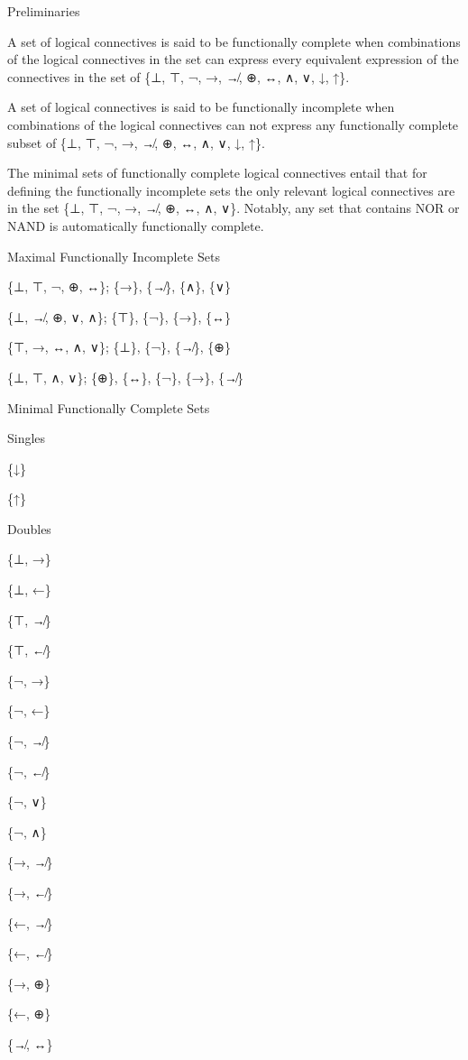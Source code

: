 \protect\hypertarget{anchor}{}{}Preliminaries

A set of logical connectives is said to be functionally complete when
combinations of the logical connectives in the set can express every
equivalent expression of the connectives in the set of \{⊥, ⊤, ¬, →, ↛,
⊕, ↔, ∧, ∨, ↓, ↑\}.

A set of logical connectives is said to be functionally incomplete when
combinations of the logical connectives can not express any functionally
complete subset of \{⊥, ⊤, ¬, →, ↛, ⊕, ↔, ∧, ∨, ↓, ↑\}.

The minimal sets of functionally complete logical connectives entail
that for defining the functionally incomplete sets the only relevant
logical connectives are in the set \{⊥, ⊤, ¬, →, ↛, ⊕, ↔, ∧, ∨\}.
Notably, any set that contains NOR or NAND is automatically functionally
complete.

\protect\hypertarget{anchor-1}{}{}Maximal Functionally Incomplete Sets

\{⊥, ⊤, ¬, ⊕, ↔\}; \{→\}, \{↛\}, \{∧\}, \{∨\}

\{⊥, ↛, ⊕, ∨, ∧\}; \{⊤\}, \{¬\}, \{→\}, \{↔\}

\{⊤, →, ↔, ∧, ∨\}; \{⊥\}, \{¬\}, \{↛\}, \{⊕\}

\{⊥, ⊤, ∧, ∨\}; \{⊕\}, \{↔\}, \{¬\}, \{→\}, \{↛\}

\protect\hypertarget{anchor-2}{}{}Minimal Functionally Complete Sets

\protect\hypertarget{anchor-3}{}{}Singles

\{↓\}

\{↑\}

\protect\hypertarget{anchor-4}{}{}Doubles

\{⊥, →\}

\{⊥, ←\}

\{⊤, ↛\}

\{⊤, ↚\}

\{¬, →\}

\{¬, ←\}

\{¬, ↛\}

\{¬, ↚\}

\{¬, ∨\}

\{¬, ∧\}

\{→, ↛\}

\{→, ↚\}

\{←, ↛\}

\{←, ↚\}

\{→, ⊕\}

\{←, ⊕\}

\{↛, ↔\}

